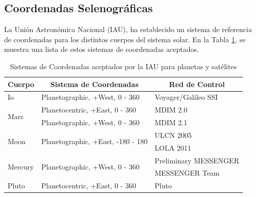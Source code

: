 \documentclass[12pt]{article}
\begin{document}
\subsection{Coordenadas Selenográficas}
La Unión Astronómica Nacional (IAU), ha establecido un sistema de referencia de coordenadas para los distintos cuerpos del sistema solar.
En la Tabla \ref{tab:IAU_coor}, se muestra una lista de estos sistemas de coordenadas aceptados.
\begin{table}[H]
    \centering
    \caption{Sistemas de Coordenadas aceptados por la IAU para planetas y satélites}
      \begin{tabular}{|p{4.215em}|p{14.355em}|p{11.93em}|}
      \toprule
      \multicolumn{1}{|c|}{Cuerpo} & \multicolumn{1}{c|}{Sistema de Coordenadas} & \multicolumn{1}{c|}{Red de Control} \\
      \midrule
      \textcolor[rgb]{ .106,  .106,  .106}{Io} & \textcolor[rgb]{ .106,  .106,  .106}{Planetographic, +West, 0 - 360} & \textcolor[rgb]{ .106,  .106,  .106}{Voyager/Galileo SSI} \\
      \midrule
      \multirow{2}[4]{*}{\textcolor[rgb]{ .106,  .106,  .106}{Mars}} & \textcolor[rgb]{ .106,  .106,  .106}{Planetocentric, +East, 0 - 360} & \textcolor[rgb]{ .106,  .106,  .106}{MDIM 2.0} \\
  \cmidrule{2-3}    \multicolumn{1}{|c|}{} & \textcolor[rgb]{ .106,  .106,  .106}{Planetographic, +West, 0 - 360} & \textcolor[rgb]{ .106,  .106,  .106}{MDIM 2.1} \\
      \midrule
      \multirow{2}[4]{*}{\textcolor[rgb]{ .106,  .106,  .106}{Moon}} & \multirow{2}[4]{*}{\textcolor[rgb]{ .106,  .106,  .106}{Planetographic, +East, -180 - 180}} & \textcolor[rgb]{ .106,  .106,  .106}{ULCN 2005} \\
  \cmidrule{3-3}    \multicolumn{1}{|c|}{} & \multicolumn{1}{c|}{} & \textcolor[rgb]{ .106,  .106,  .106}{LOLA 2011} \\
      \midrule
      \multirow{2}[4]{*}{\textcolor[rgb]{ .106,  .106,  .106}{Mercury}} & \multirow{2}[4]{*}{\textcolor[rgb]{ .106,  .106,  .106}{Planetographic, +West, 0 - 360}} & \textcolor[rgb]{ .106,  .106,  .106}{Preliminary MESSENGER} \\
  \cmidrule{3-3}    \multicolumn{1}{|c|}{} & \multicolumn{1}{c|}{} & \textcolor[rgb]{ .106,  .106,  .106}{MESSENGER Team} \\
      \midrule
      \textcolor[rgb]{ .106,  .106,  .106}{Pluto} & \textcolor[rgb]{ .106,  .106,  .106}{Planetocentric, +East, 0 - 360} & \textcolor[rgb]{ .106,  .106,  .106}{Pluto} \\
      \bottomrule
      \end{tabular}%
    \label{tab:IAU_coor}%
\end{table}%
\end{document}
